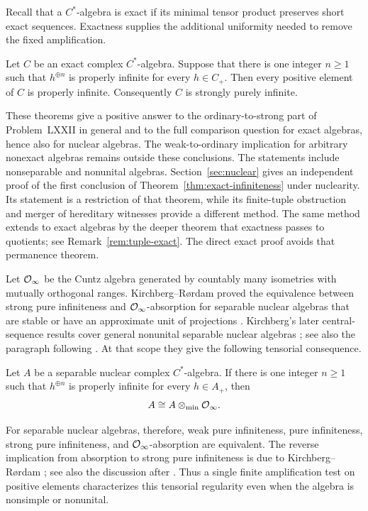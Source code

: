 Recall that a \(C^*\)-algebra is exact if its minimal tensor product
preserves short exact sequences.  Exactness supplies the additional
uniformity needed to remove the fixed amplification.

\begin{theorem}\label{thm:exact-infiniteness}
Let \(C\) be an exact complex \(C^*\)-algebra.  Suppose that there is
one integer \(n\ge1\) such that \(h^{\oplus n}\) is properly infinite
for every \(h\in C_+\).  Then every positive element of \(C\) is
properly infinite.  Consequently \(C\) is strongly purely infinite.
\end{theorem}

These theorems give a positive answer to the ordinary-to-strong part
of Problem~LXXII in general and to the full comparison question for
exact algebras, hence also for nuclear algebras.  The weak-to-ordinary implication
for arbitrary nonexact algebras remains outside these conclusions.
The statements include nonseparable and nonunital algebras.  Section~\ref{sec:nuclear}
gives an independent proof of the first conclusion of
Theorem~\ref{thm:exact-infiniteness} under nuclearity.  Its statement
is a restriction of that theorem, while its finite-tuple obstruction
and merger of hereditary witnesses provide a different method.
The same method extends to exact algebras by the deeper theorem that
exactness passes to quotients; see Remark~\ref{rem:tuple-exact}.
The direct exact proof avoids that permanence theorem.

Let \(\mathcal O_\infty\) be the Cuntz algebra generated by countably many
isometries with mutually orthogonal ranges.  Kirchberg--R{\o}rdam
proved the equivalence between strong pure infiniteness and
\(\mathcal O_\infty\)-absorption for separable nuclear algebras that are stable
or have an approximate unit of projections \cite{KR2002}.
Kirchberg's later central-sequence results cover general nonunital
separable nuclear algebras
\cite[Proposition~4.4 and Remark~4.6]{Kirchberg2006}; see also the
paragraph following \cite[Definition~3.1]{KS}.  At that scope they
give the following tensorial consequence.

\begin{corollary}\label{cor:absorption}
Let \(A\) be a separable nuclear complex \(C^*\)-algebra.  If there is
one integer \(n\ge1\) such that \(h^{\oplus n}\) is properly infinite
for every \(h\in A_+\), then
\[
 A\cong A\otimes_{\min}\mathcal O_\infty.
\]
\end{corollary}

For separable nuclear algebras, therefore, weak pure infiniteness,
pure infiniteness, strong pure infiniteness, and \(\mathcal O_\infty\)-absorption
are equivalent.  The reverse implication from absorption to strong
pure infiniteness is due to Kirchberg--R{\o}rdam
\cite{KR2002}; see also the discussion after
\cite[Definition~3.1]{KS}.  Thus a single finite amplification test
on positive elements characterizes this tensorial regularity even
when the algebra is nonsimple or nonunital.

